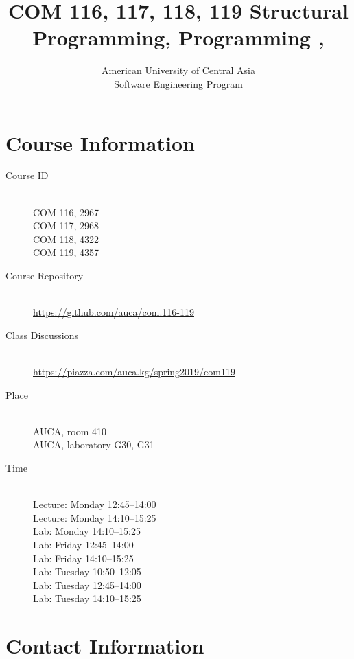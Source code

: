 \documentclass[12pt,a4paper,oneside]{article}
\newcommand{\R}[1]{\uppercase\expandafter{\romannumeral #1\relax}}
\begin{document}
    \title{COM 116, 117, 118, 119 Structural Programming, Programming \R{1}, \R{2}}
    \author{
        American University of Central Asia\\
        Software Engineering Program
    }
    \date{}
    \maketitle

    \section{Course Information}

        \begin{description}
            \item[Course ID]\hfill\\
                COM 116, 2967\\
                COM 117, 2968\\
                COM 118, 4322\\
                COM 119, 4357
            \item[Course Repository]\hfill\\
                \url{https://github.com/auca/com.116-119}
            \item[Class Discussions]\hfill\\
                \url{https://piazza.com/auca.kg/spring2019/com119}
            \item[Place]\hfill\\
                AUCA, room 410\\
                AUCA, laboratory G30, G31
            \item[Time]\hfill\\
                Lecture: Monday 12:45--14:00\\
                Lecture: Monday 14:10--15:25\\
                Lab: Monday 14:10--15:25\\
                Lab: Friday 12:45--14:00\\
                Lab: Friday 14:10--15:25\\
                Lab: Tuesday 10:50--12:05\\
                Lab: Tuesday 12:45--14:00\\
                Lab: Tuesday 14:10--15:25
        \end{description}

    \section{Contact Information}
\end{document}
